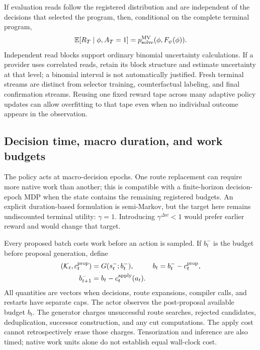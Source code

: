 If evaluation reads follow the registered distribution and are independent of the decisions that
selected the program, then, conditional on the complete terminal program,
\begin{equation}
 \mathbb{E}[R_T\mid\phi,A_T=1]
 =p_{\mathrm{solve}}^{\rm MV}(\phi,F_\psi(\phi)).
 \label{eq:rl-reward-unbiased}
\end{equation}
Independent read blocks support ordinary binomial uncertainty calculations. If a provider uses
correlated reads, retain its block structure and estimate uncertainty at that level; a binomial
interval is not automatically justified. Fresh terminal streams are distinct from selector training,
counterfactual labeling, and final confirmation streams. Reusing one fixed reward tape across many
adaptive policy updates can allow overfitting to that tape even when no individual outcome appears
in the observation.

\subsection{Decision time, macro duration, and work budgets}

The policy acts at macro-decision epochs. One route replacement can require more native work than
another; this is compatible with a finite-horizon decision-epoch MDP when the state contains the
remaining registered budgets. An explicit duration-based formulation is semi-Markov, but the target
here remains undiscounted terminal utility: \(\gamma=1\). Introducing \(\gamma^{\Delta w}<1\)
would prefer earlier reward and would change that target.

Every proposed batch costs work before an action is sampled. If \(b_t^-\) is the budget before
proposal generation, define
\begin{align}
 (\mathcal K_t,c_t^{\rm prop})&=G(s_t^-;b_t^-), &
 b_t&=b_t^- -c_t^{\rm prop},\\
 b_{t+1}^-&=b_t-c_t^{\rm apply}(a_t). &&
 \label{eq:rl-budget-accounting}
\end{align}
All quantities are vectors when decisions, route expansions, compiler calls, and restarts have
separate caps. The actor observes the post-proposal available budget \(b_t\). The generator charges
unsuccessful route searches, rejected candidates, deduplication, successor construction, and any
cut computations. The apply cost cannot retrospectively erase those charges. Tensorization and
inference are also timed; native work units alone do not establish equal wall-clock cost.

